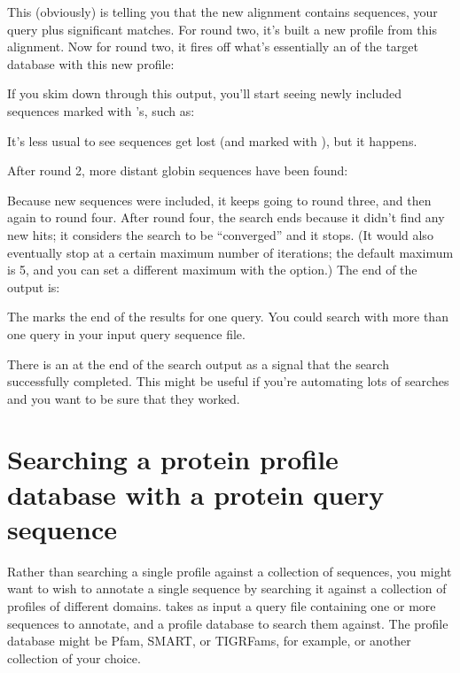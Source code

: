 
This (obviously) is telling you that the new alignment contains \JHUninc{}
sequences, your query plus \JHUnsig{} significant matches. For round two,
it's built a new profile from this alignment. Now for round two, it
fires off what's essentially an  of the target
database with this new profile:


If you skim down through this output, you'll start seeing newly
included sequences marked with \mono{+}'s, such as:


It's less usual to see sequences get lost (and marked with \mono{-}),
but it happens.

After round 2, more distant globin sequences have been found:


Because new sequences were included, it keeps going to round three,
and then again to round four. After round four, the search ends
because it didn't find any new hits; it considers the search to be
``converged'' and it stops. (It would also eventually stop at a
certain maximum number of iterations; the default maximum is 5, and
you can set a different maximum with the  option.)  The end
of the output is:


The \mono{//} marks the end of the results for one query. You could
search with more than one query in your input query sequence
file. 

There is an \mono{[ok]} at the end of the search output as a signal
that the search successfully completed. This might be useful if you're
automating lots of searches and you want to be sure that they worked.



\section{Searching a protein profile database with a protein query sequence}

Rather than searching a single profile against a collection of
sequences, you might want to wish to annotate a single sequence by
searching it against a collection of profiles of different domains.
 takes as input a query file containing one or more
sequences to annotate, and a profile database to search them against.
The profile database might be Pfam, SMART, or TIGRFams, for example, or
another collection of your choice. 

